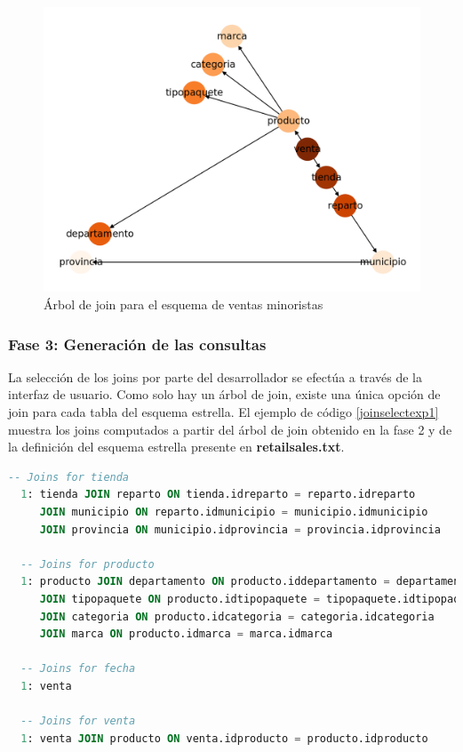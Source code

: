 \begin{figure}[H]
  \centering
  \includegraphics[scale=0.6]{Graphics/jointree1.png}
  \caption{\'Arbol de join para el esquema de ventas minoristas}
  \label{fig:jointree1}
\end{figure}

\subsubsection{Fase 3: Generaci\'on de las consultas}

La selección de los joins por parte del desarrollador se efectúa a través de la interfaz de usuario. 
Como solo hay un \'arbol de join, existe una \'unica opción de join para 
cada tabla del esquema estrella. El ejemplo de código \ref{joinselectexp1} muestra los joins 
computados a partir del \'arbol de join obtenido en la fase 2 y de la definición del esquema estrella 
presente en \textbf{retailsales.txt}.

\begin{lstlisting}[label={joinselectexp1}, caption={Joins computados para el experimento 1}, language={sql}]
  -- Joins for tienda
  1: tienda JOIN reparto ON tienda.idreparto = reparto.idreparto 
     JOIN municipio ON reparto.idmunicipio = municipio.idmunicipio 
     JOIN provincia ON municipio.idprovincia = provincia.idprovincia

  -- Joins for producto
  1: producto JOIN departamento ON producto.iddepartamento = departamento.iddepartamento 
     JOIN tipopaquete ON producto.idtipopaquete = tipopaquete.idtipopaquete 
     JOIN categoria ON producto.idcategoria = categoria.idcategoria 
     JOIN marca ON producto.idmarca = marca.idmarca

  -- Joins for fecha
  1: venta

  -- Joins for venta
  1: venta JOIN producto ON venta.idproducto = producto.idproducto
  
\end{lstlisting}

